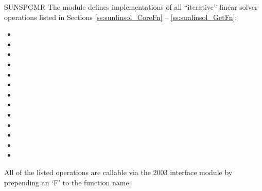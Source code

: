 {SUNSPGMR}
%
%
The {\sunlinsolspgmr} module defines implementations of all
``iterative'' linear solver operations listed in Sections
\ref{ss:sunlinsol_CoreFn} -- \ref{ss:sunlinsol_GetFn}:
\begin{itemize}
\item {}
\item {}
\item {}
\item {}
\item {}
\item {}
\item {}
\item {}
\item {}
\item {}
\item {}
\item {}
\item {}
\end{itemize}
All of the listed operations are callable via the {\F} 2003 interface module
by prepending an `F' to the function name.

